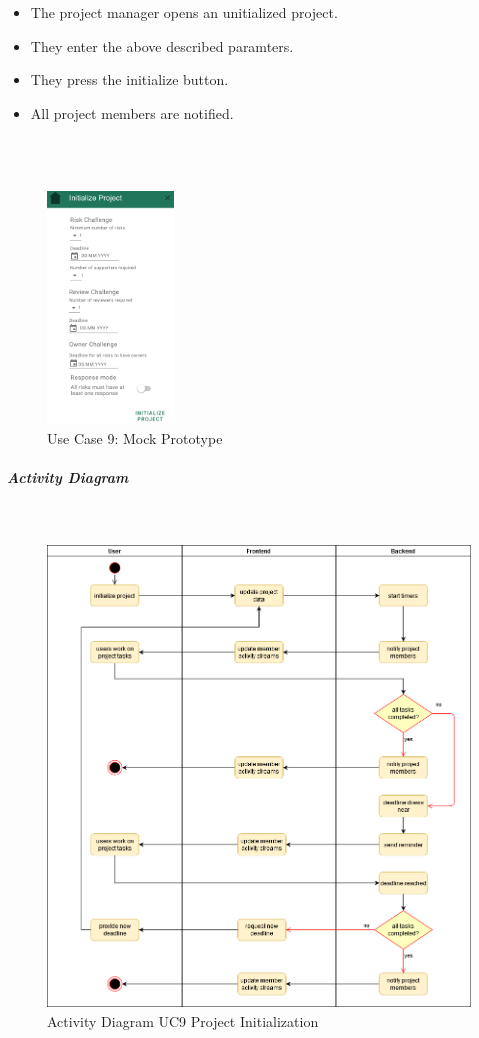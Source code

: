 \begin{itemize}
	\vspace{-3mm}
	\setlength\itemsep{-1em}
	\item The project manager opens an unitialized project.
	\item They enter the above described paramters.
	\item They press the initialize button.
	\item All project members are notified.
\end{itemize} 
\\ \\
\begin{figure}[H]
	\centering
	\includegraphics[width=0.3\textwidth]{Assets/UC_Screenshots/UC9S.png}
	\caption{Use Case 9: Mock Prototype}
	\label{fig:useCase9Detail}
\end{figure}
\newpage
\subparagraph{Activity Diagram}\mbox{}\\
\begin{figure}[H]
	\centering
	\includegraphics[width=1.0\textwidth]{Content/Domain/UC9Initialization.png}
	\caption{Activity Diagram  \ac{UC}9 Project Initialization}
	\label{fig:label14}
\end{figure}
\newpage
